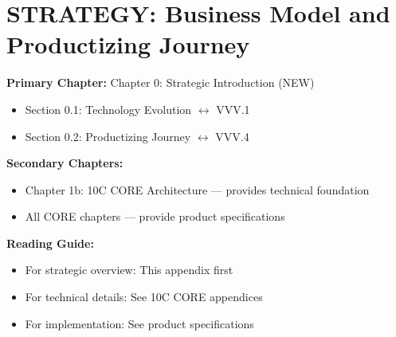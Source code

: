 %
%

%
%
%
%
%

\chapter{STRATEGY: Business Model and Productizing Journey}
\label{app:vvv}

\begin{tcolorbox}[colback=purple!5!white, colframe=purple!75!black,
    title=Chapter Linkage]

\textbf{Primary Chapter:} Chapter 0: Strategic Introduction (NEW)
\begin{itemize}[nosep]
\item Section 0.1: Technology Evolution $\leftrightarrow$ VVV.1
\item Section 0.2: Productizing Journey $\leftrightarrow$ VVV.4
\end{itemize}

\textbf{Secondary Chapters:}
\begin{itemize}[nosep]
\item Chapter 1b: 10C CORE Architecture --- provides technical foundation
\item All CORE chapters --- provide product specifications
\end{itemize}

\textbf{Reading Guide:}
\begin{itemize}[nosep]
\item For strategic overview: This appendix first
\item For technical details: See 10C CORE appendices
\item For implementation: See product specifications
\end{itemize}

\end{tcolorbox}

